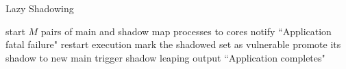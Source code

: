 \begin{algorithm}[t]
  \caption{Lazy Shadowing}
  \BlankLine
  start $M$ pairs of main and shadow\;
  map processes to cores\;
    {
        {
            {
                notify ``Application fatal failure"\;
                restart execution\; %
            }
            {
                mark the shadowed set as vulnerable\;
                {
                    promote its shadow to new main\;
                    trigger shadow leaping\; %
                }
            }
        }  
    }
    output ``Application completes"\;
  \label{al:ls}
\end{algorithm}

